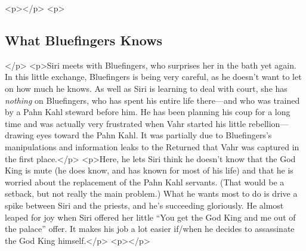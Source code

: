<p></p>
<p>\subsection*{What Bluefingers Knows}</p>
<p>Siri meets with Bluefingers, who surprises her in the bath yet again. In this little exchange, Bluefingers is being very careful, as he doesn’t want to let on how much he knows. As well as Siri is learning to deal with court, she has \textit{nothing} on Bluefingers, who has spent his entire life there—and who was trained by a Pahn Kahl steward before him. He has been planning his coup for a long time and was actually very frustrated when Vahr started his little rebellion—drawing eyes toward the Pahn Kahl. It was partially due to Bluefingers’s manipulations and information leaks to the Returned that Vahr was captured in the first place.</p>
<p>Here, he lets Siri think he doesn’t know that the God King is mute (he does know, and has known for most of his life) and that he is worried about the replacement of the Pahn Kahl servants. (That would be a setback, but not really the main problem.) What he wants most to do is drive a spike between Siri and the priests, and he’s succeeding gloriously. He almost leaped for joy when Siri offered her little “You get the God King and me out of the palace” offer. It makes his job a lot easier if/when he decides to assassinate the God King himself.</p>
<p></p>




